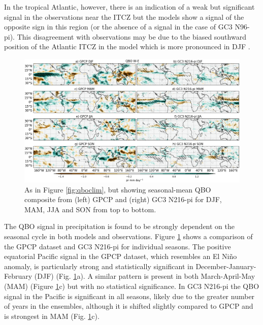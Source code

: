 In the tropical Atlantic, however, there is an indication of a weak but significant signal in the observations near the ITCZ but the models show a signal of the opposite sign in this region (or the absence of a signal in the case of GC3 N96-pi). This disagreement with observations may be due to the biased southward position of the Atlantic ITCZ in the model which is more pronounced in DJF \citep{garciafranco2020}.

\begin{figure}[t!]
\centering
 \includegraphics[width=\linewidth]{figures/paperprqbowqboe.png}
\caption[Seasonal mean precipitation composite difference QBO W-E ]{ As in Figure \ref{fig:qboclim}, but showing seasonal-mean QBO composite  from (left) GPCP and (right) GC3 N216-pi for DJF, MAM, JJA and SON from top to bottom. }
\label{fig:qbodjf}
\end{figure}

The QBO signal in precipitation is found to be strongly dependent on the seasonal cycle in both models and observations. Figure \ref{fig:qbodjf} shows a comparison of the GPCP dataset and GC3 N216-pi for individual seasons. The positive equatorial Pacific signal in the GPCP dataset, which resembles an El Niño anomaly, is particularly strong and statistically significant in December-January-February (DJF) (Fig. \ref{fig:qbodjf}a). A similar pattern is present in both March-April-May (MAM) (Figure \ref{fig:qbodjf}c) but with no statistical significance. In GC3 N216-pi the QBO signal in the Pacific is significant in all seasons, likely due to the greater number of years in the ensembles, although it is shifted slightly compared to GPCP and is strongest in MAM (Fig. \ref{fig:qbodjf}c).   


